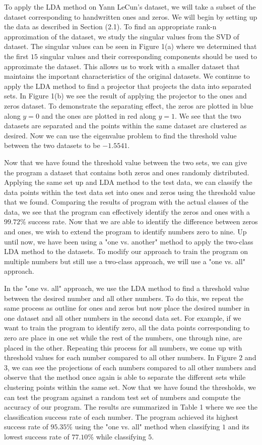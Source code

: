 \documentclass[12pt]{article}%
\numberwithin{equation}{subsection}
\begin{document}
To apply the LDA method on Yann LeCun's dataset, we will take a subset of the dataset corresponding to handwritten ones and zeros. We will begin by setting up the data as described in Section (2.1). To find an appropriate rank-n approximation of the dataset, we study the singular values from the SVD of dataset. The singular values can be seen in Figure 1(a) where we determined that the first $15$ singular values and their corresponding components should be used to approximate the dataset. This allows us to work with a smaller dataset that maintains the important characteristics of the original datasets. We continue to apply the LDA method to find a projector that projects the data into separated sets. In Figure 1(b) we see the result of applying the projector to the ones and zeros dataset. To demonstrate the separating effect, the zeros are plotted in blue along $y=0$ and the ones are plotted in red along $y=1$. We see that the two datasets are separated and the points within the same dataset are clustered as desired. Now we can use the eigenvalue problem to find the threshold value between the two datasets to be $-1.5541$. 

Now that we have found the threshold value between the two sets, we can give the program a dataset that contains both zeros and ones randomly distributed. Applying the same set up and LDA method to the test data, we can classify the data points within the test data set into ones and zeros using the threshold value that we found. Comparing the results of program with the actual classes of the data, we see that the program can effectively identify the zeros and ones with a $99.72 \%$ success rate. Now that we are able to identify the difference between zeros and ones, we wish to extend the program to identify numbers zero to nine. Up until now, we have been using a "one vs. another" method to apply the two-class LDA method to the datasets. To modify our approach to train the program on multiple numbers but still use a two-class approach, we will use a "one vs. all" approach.

In the "one vs. all" approach, we use the LDA method to find a threshold value between the desired number and all other numbers. To do this, we repeat the same process as outline for ones and zeros but now place the desired number in one dataset and all other numbers in the second data set. For example, if we want to train the program to identify zero, all the data points corresponding to zero are place in one set while the rest of the numbers, one through nine, are placed in the other. Repeating this process for all numbers, we come up with threshold values for each number compared to all other numbers. In Figure 2 and 3, we can see the projections of each numbers compared to all other numbers and observe that the method once again is able to separate the different sets while clustering points within the same set. Now that we have found the thresholds, we can test the program against a random test set of numbers and compute the accuracy of our program. The results are summarized in Table 1 where we see the classification success rate of each number. The program achieved its highest success rate of $95.35\%$ using the "one vs. all" method when classifying $1$ and its lowest success rate of $77.10\%$ while classifying $5$. 
\end{document}
